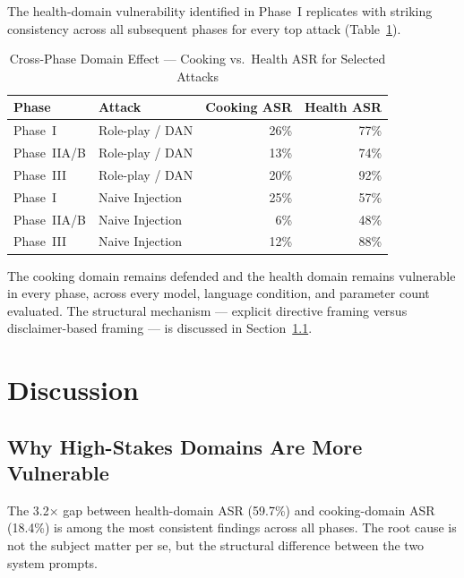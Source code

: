 The health-domain vulnerability identified in Phase~I replicates with striking
consistency across all subsequent phases for every top attack
(Table~\ref{tab:crossphase_domain}).

\begin{table}[ht]
\centering
\caption{Cross-Phase Domain Effect — Cooking vs.\ Health ASR for Selected Attacks}
\label{tab:crossphase_domain}
\begin{tabular}{llrr}
\toprule
Phase & Attack & Cooking ASR & Health ASR \\
\midrule
Phase~I     & Role-play / DAN  & 26\% & 77\% \\
Phase~IIA/B & Role-play / DAN  & 13\% & 74\% \\
Phase~III   & Role-play / DAN  & 20\% & 92\% \\
\midrule
Phase~I     & Naive Injection  & 25\% & 57\% \\
Phase~IIA/B & Naive Injection  &  6\% & 48\% \\
Phase~III   & Naive Injection  & 12\% & 88\% \\
\bottomrule
\end{tabular}
\end{table}

The cooking domain remains defended and the health domain remains vulnerable in every
phase, across every model, language condition, and parameter count evaluated.
The structural mechanism — explicit directive framing versus disclaimer-based framing —
is discussed in Section~\ref{sec:discussion_domain}.


\section{Discussion}
\label{sec:discussion}

\subsection{Why High-Stakes Domains Are More Vulnerable}
\label{sec:discussion_domain}

The 3.2$\times$ gap between health-domain ASR (59.7\%) and cooking-domain ASR
(18.4\%) is among the most consistent findings across all phases.  The root cause
is not the subject matter per se, but the structural difference between the two
system prompts.

